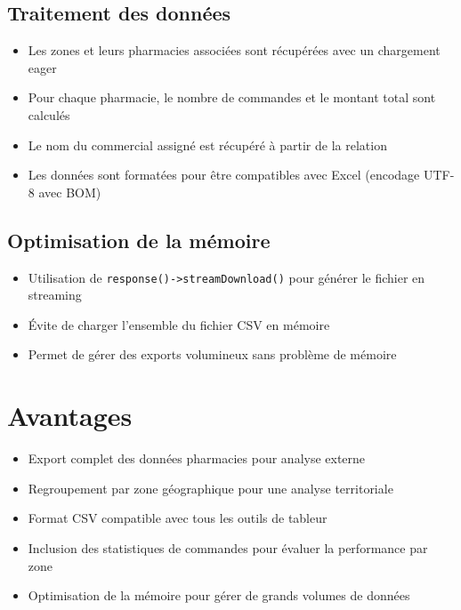 \documentclass[12pt,a4paper]{article}
\begin{document}
\subsection{Traitement des données}
\begin{itemize}
    \item Les zones et leurs pharmacies associées sont récupérées avec un chargement eager
    \item Pour chaque pharmacie, le nombre de commandes et le montant total sont calculés
    \item Le nom du commercial assigné est récupéré à partir de la relation
    \item Les données sont formatées pour être compatibles avec Excel (encodage UTF-8 avec BOM)
\end{itemize}

\subsection{Optimisation de la mémoire}
\begin{itemize}
    \item Utilisation de \texttt{response()->streamDownload()} pour générer le fichier en streaming
    \item Évite de charger l'ensemble du fichier CSV en mémoire
    \item Permet de gérer des exports volumineux sans problème de mémoire
\end{itemize}

\section{Avantages}
\begin{itemize}
    \item Export complet des données pharmacies pour analyse externe
    \item Regroupement par zone géographique pour une analyse territoriale
    \item Format CSV compatible avec tous les outils de tableur
    \item Inclusion des statistiques de commandes pour évaluer la performance par zone
    \item Optimisation de la mémoire pour gérer de grands volumes de données
\end{itemize}
\end{document}
